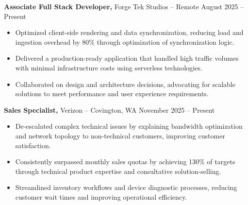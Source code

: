 \documentclass[11pt]{article}       %
\begin{document}
\textbf{Associate Full Stack Developer,} {Forge Tek Studios} -- Remote \hfill August 2025 -- Present \\
\vspace{-9pt}
\begin{itemize}
  \item Optimized client-side rendering and data synchronization, reducing load and ingestion overhead by 80\% through optimization of synchronization logic.
  \item Delivered a production-ready application that handled high traffic volumes with minimal infrastructure costs using serverless technologies.
  \item Collaborated on design and architecture decisions, advocating for scalable solutions to meet performance and user experience requirements.
\end{itemize}

\textbf{Sales Specialist,} {Verizon} -- Covington, WA \hfill November 2025 -- Present \\
\vspace{-9pt}
\begin{itemize}
  \item De-escalated complex technical issues by explaining bandwidth optimization and network topology to non-technical customers, improving customer satisfaction.
  \item Consistently surpassed monthly sales quotas by achieving 130\% of targets through technical product expertise and consultative solution-selling.
  \item Streamlined inventory workflows and device diagnostic processes, reducing customer wait times and improving operational efficiency.
\end{itemize}
\end{document}

